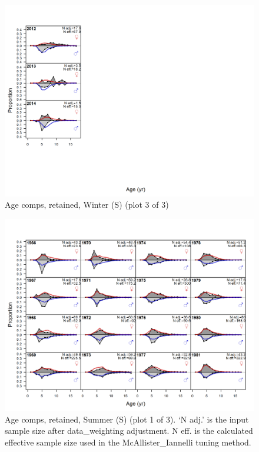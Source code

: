 \documentclass[12pt,]{article}
\begin{document}
\begin{figure}
\centering
\includegraphics{r4ss/plots_mod1/comp_agefit_flt3mkt2_page3.png}
\caption{Age comps, retained, Winter (S) (plot 3 of 3)
\label{fig:age_fits}}
\end{figure}

\begin{figure}
\centering
\includegraphics{r4ss/plots_mod1/comp_agefit_flt4mkt2_page1.png}
\caption{Age comps, retained, Summer (S) (plot 1 of 3). `N adj.' is the
input sample size after data\_weighting adjustment. N eff. is the
calculated effective sample size used in the McAllister\_Iannelli tuning
method. \label{fig:age_fits}}
\end{figure}
\end{document}
